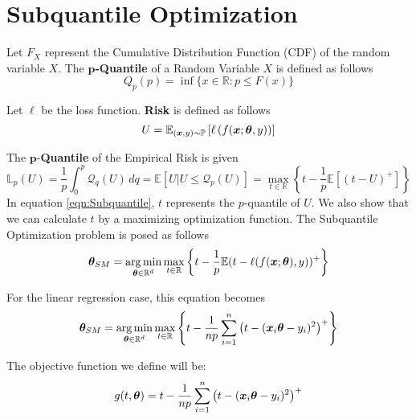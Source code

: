 \documentclass{article} %
\begin{document}
	\section{Subquantile Optimization}
	\label{sec:Subquantile-optimization}
	
	\begin{definition}
		Let $F_X$ represent the Cumulative Distribution Function (CDF) of the random variable $X$. The \textbf{$\mathbf{p}$-Quantile} of a Random Variable $X$ is defined as follows \vspace{1em}
		\begin{equation}
			Q_p(p) = \inf\{x\in\mathbb{R}: p \leq F(x)\} 
		\end{equation}
	\end{definition}
	
	\begin{definition}
		Let $\ell$ be the loss function. \textbf{Risk} is defined as follows
		\begin{equation}
			U = \mathbb{E}_{({\bm{x}},y) \sim \mathbb{P}}\left[\ell \left( f({\bm{x}};{\bm{\theta}},y)\right)\right]
		\end{equation}
	\end{definition}
	The $\mathbf{p}$-\textbf{Quantile} of the Empirical Risk is given
	\begin{equation}\label{eqn:Subquantile}
		\mathbb{L}_p(U) = \frac{1}{p}\int_0^p \mathcal{Q}_q(U)\,dq = \mathbb{E}\left[U|U \leq \mathcal{Q}_p(U) \right] = \max_{t\in \mathbb{R}}\left\{t - \frac{1}{p}\mathbb{E}\left[(t-U)^+\right]\right\}
	\end{equation}
	In equation \ref{eqn:Subquantile}, $t$ represents the $p$-quantile of $U$. We also show that we can calculate $t$ by a maximizing optimization function. 
	The Subquantile Optimization problem is posed as follows
	\begin{equation}
		{\bm{\theta}}_{SM} = \operatorname*{arg\,min}_{{\bm{\theta}} \in \mathbb{R}^d} \max_{t \in \mathbb{R}} \left\{t - \frac{1}{p}\mathbb{E}(t - \ell(f({\bm{x}};{\bm{\theta}}),y))^+\right\}
	\end{equation}
	
	For the linear regression case, this equation becomes 
	\begin{equation}
		\label{eqn:theta_sm}
		{\bm{\theta}}_{SM} = \operatorname*{arg\,min}_{{\bm{\theta}} \in \mathbb{R}^d} \max_{t \in \mathbb{R}} \left\{t - \frac{1}{np}\sum_{i=1}^n\left(t-({\bm{x}}_i {\bm{\theta}} - y_i)^2\right)^+\right\}
	\end{equation}
	
	The objective function we define will be: 
	\begin{equation}
		g(t,{\bm{\theta}}) = t - \frac{1}{np} \sum_{i=1}^n\left(t - ({\bm{x}}_i {\bm{\theta}} - y_i)^2\right)^+
	\end{equation}
		
\end{document}
